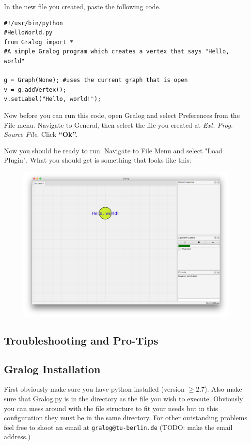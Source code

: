 \documentclass{article}
\begin{document}
In the new file you created, paste the following code.


\begin{lstlisting}[title={Code Snippet 1},label=codeSnippet1]
#!/usr/bin/python
#HelloWorld.py
from Gralog import *
#A simple Gralog program which creates a vertex that says "Hello, world"

g = Graph(None); #uses the current graph that is open
v = g.addVertex();
v.setLabel("Hello, world!");
\end{lstlisting}

Now before you can run this code, open Gralog and select Preferences from the File menu. Navigate to General, then select the file you created at \emph{Ext. Prog. Source File}. Click \textbf{``Ok''.}

Now you should be ready to run. Navigate to File Menu and select "Load Plugin". What you should get is something that looks like this: 

\begin{figure}[H]
\centering
\includegraphics[width=\textwidth]{helloWorld.png}
\end{figure}


\subsection{Troubleshooting and Pro-Tips}
\subsection{Gralog Installation}
First obviously make sure you have python installed (version $\ge
2.7$). Also make sure that Gralog.py is in the directory as the file you
wish to execute. Obviously you can mess around with the file structure
to fit your needs but in this configuration they must be in the same
directory. For other outstanding problems feel free to shoot an email
at \texttt{gralog@tu-berlin.de} (TODO: make the email address.)
\end{document}
